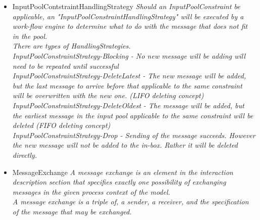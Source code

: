 \begin{itemize}
\begin{itemize}
\begin{itemize}
\begin{itemize}
{			E.g. "Only one order from the same customer" (during happy hour at the bar)}
			\item MessageTypeConstraint \linebreak \textit{An InputPool constraint that limits the number of message of a certain type in the input pool.\\
			E.g. You can accept only "three request at once}
			\item SenderTypeConstraint \linebreak \textit{An InputPool constraint that limits the number of message from a certain Sender subject in the input pool.\\
			E.g. as long as a customer has non non-fulfilled request of any type he may not place messages}
		\end{itemize}
		\item InputPoolContstraintHandlingStrategy \linebreak \textit{Should an InputPoolConstraint be applicable, an "InputPoolConstraintHandlingStrategy" will be executed by a work-flow engine to determine what to do with the message that does not fit in the pool.\\
		There are types of HandlingStrategies. \\
		InputPoolConstraintStrategy-Blocking - No new message will be adding will need to be repeated until successful \\
		InputPoolConstraintStrategy-DeleteLatest - The new message will be added, but the last message to arrive before that applicable to the same constraint will be overwritten with the new one. (LIFO deleting concept)\\
		InputPoolConstraintStrategy-DeleteOldest - The message will be added, but the earliest message in the input pool applicable to the same constraint will be deleted (FIFO deleting concept)\\
		InputPoolConstraintStrategy-Drop - Sending of the message succeeds. However the new message will not be added to the in-box. Rather it will be deleted directly.}
		\item MessageExchange \linebreak \textit{A message exchange is an element in the interaction description section that specifies exactly one possibility of exchanging messages in the given process context of the model.\\
		A message exchange is a triple of, a sender, a receiver, and the specification of the message that may be exchanged.\\
}
\end{itemize}
\end{itemize}
\end{itemize}
